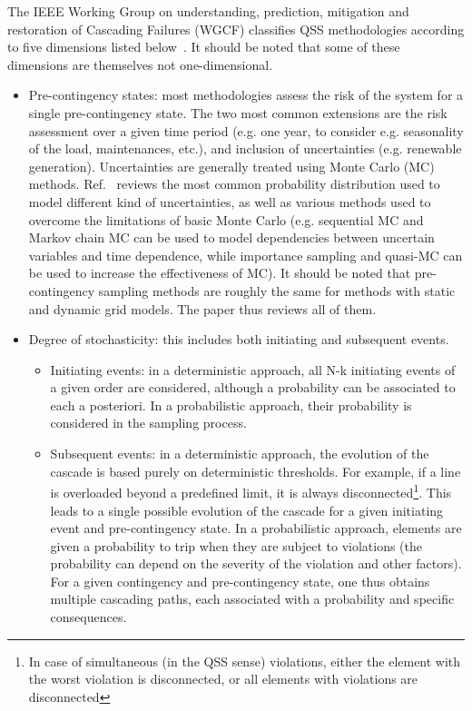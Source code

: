 The IEEE Working Group on understanding, prediction, mitigation and restoration of Cascading Failures (WGCF) classifies QSS methodologies according to five dimensions listed below~\cite{Benchmarking2018}. It should be noted that some of these dimensions are themselves not one-dimensional.

\begin{itemize}
    \item Pre-contingency states: most methodologies assess the risk of the system for a single pre-contingency state. The two most common extensions are the risk assessment over a given time period (e.g. one year, to consider e.g. seasonality of the load, maintenances, etc.), and inclusion of uncertainties (e.g. renewable generation). Uncertainties are generally treated using Monte Carlo (MC) methods. Ref.~\cite{PSAreviewPreeceMilanovic} reviews the most common probability distribution used to model different kind of uncertainties, as well as various methods used to overcome the limitations of basic Monte Carlo (e.g. sequential MC and Markov chain MC can be used to model dependencies between uncertain variables and time dependence, while importance sampling and quasi-MC can be used to increase the effectiveness of MC). It should be noted that pre-contingency sampling methods are roughly the same for methods with static and dynamic grid models. The paper thus reviews all of them.
    \item Degree of stochasticity: this includes both initiating and subsequent events.
    \begin{itemize}
        \item Initiating events: in a deterministic approach, all N-k initiating events of a given order are considered, although a probability can be associated to each a posteriori. In a probabilistic approach, their probability is considered in the sampling process.
        \item Subsequent events: in a deterministic approach, the evolution of the cascade is based purely on deterministic thresholds. For example, if a line is overloaded beyond a predefined limit, it is always disconnected\footnote{In case of simultaneous (in the QSS sense) violations, either the element with the worst violation is disconnected, or all elements with violations are disconnected}. This leads to a single possible evolution of the cascade for a given initiating event and pre-contingency state. In a probabilistic approach, elements are given a probability to trip when they are subject to violations (the probability can depend on the severity of the violation and other factors). For a given contingency and pre-contingency state, one thus obtains multiple cascading paths, each associated with a probability and specific consequences.

\end{itemize}
\end{itemize}
